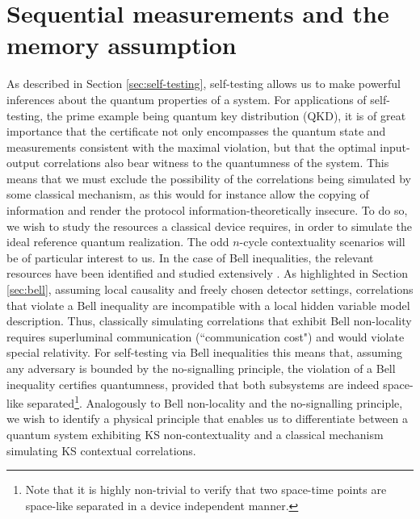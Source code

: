 \section{Sequential measurements and the memory assumption}
\label{sec:memoryass}
As described in Section \ref{sec:self-testing}, self-testing allows us to make powerful inferences about the quantum properties of a system. For applications of self-testing, the prime example being quantum key distribution (QKD), it is of great importance that the certificate not only encompasses the quantum state and measurements consistent with the maximal violation, but that the optimal input-output correlations also bear witness to the quantumness of the system. This means that we must exclude the possibility of the correlations being simulated by some classical mechanism, as this would for instance allow the copying of information and render the protocol information-theoretically insecure. To do so, we wish to study the resources a classical device requires, in order to simulate the ideal reference quantum realization. The odd $n$-cycle contextuality scenarios will be of particular interest to us. 
In the case of Bell inequalities, the relevant resources have been identified and studied extensively \cite{Brassard1999,Toner2003}. As highlighted in Section \ref{sec:bell}, assuming local causality and freely chosen detector settings, correlations that violate a Bell inequality are incompatible with a local hidden variable model description. Thus, classically simulating correlations that exhibit Bell non-locality requires superluminal communication (``communication cost") \cite{Toner2003} and would violate special relativity. For self-testing via Bell inequalities this means that, assuming any adversary is bounded by the no-signalling principle, the violation of a Bell inequality certifies quantumness, provided that both subsystems are indeed space-like separated\footnote{Note that it is highly non-trivial to verify that two space-time points are space-like separated in a device independent manner.}. Analogously to Bell non-locality and the no-signalling principle, we wish to identify a physical principle that enables us to differentiate between a quantum system exhibiting KS non-contextuality and a classical mechanism simulating KS contextual correlations.
